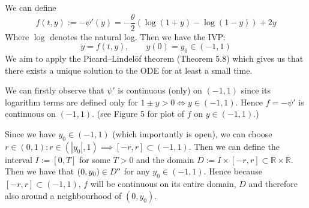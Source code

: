 \documentclass[]{article}
\newcommand{\interior}[1]{%
  {\kern0pt#1}^{\mathrm{o}}%
}
\begin{document}
  \noindent We can define \vspace{-0.2cm} \[ 
  f(t,y) := -\psi'(y) = -\frac{\theta}{2}\left(\log(1+y) - \log(1-y)\right) + 2y
  \] 
 Where $\log$ denotes the natural log. Then we have the IVP:
  \[
  \dot{y} = f(t,y), \qquad y(0) = y_0 \in (-1,1)
  \]
  \noindent We aim to apply the Picard–Lindelöf theorem (Theorem 5.8) which gives us that there exists a unique solution to the ODE for at least a small time.\newline

\noindent We can firstly observe that $\psi'$ is continuous (only) on $(-1,1)$ since its logarithm terms are defined only for $1\pm y > 0 \iff y\in (-1,1)$. Hence $f = -\psi'$ is continuous on $(-1,1)$. (see Figure 5 for plot of $f$ on $y \in (-1,1)$.)\newline

    \noindent Since we have $y_0 \in (-1,1)$ (which importantly is open), we can choose $r\in(0,1): r\in (|y_0|,1) \implies [-r,r] \subset (-1,1)$. Then we can define the interval $I := [0,T]$ for some $T >0$ and the domain $D:=I \times [-r,r] \subset \mathbb{R} \times \mathbb{R}$. Then we have that $(0,y_0)\in \interior{D}$ for any $y_0 \in (-1,1)$. Hence because $[-r,r] \subset (-1,1)$, $f$ will be continuous on its entire domain, $D$ and therefore also around a neighbourhood of $(0,y_0)$.\newline
\end{document}
